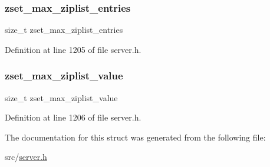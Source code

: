 \subsubsection{\texorpdfstring{zset\+\_\+max\+\_\+ziplist\+\_\+entries}{zset\_max\_ziplist\_entries}}
{\footnotesize\ttfamily size\+\_\+t zset\+\_\+max\+\_\+ziplist\+\_\+entries}



Definition at line 1205 of file server.\+h.

\mbox{\label{structredis_server_ae1bafd11e7b9f269c3ab48acb8046f32}} 
\subsubsection{\texorpdfstring{zset\+\_\+max\+\_\+ziplist\+\_\+value}{zset\_max\_ziplist\_value}}
{\footnotesize\ttfamily size\+\_\+t zset\+\_\+max\+\_\+ziplist\+\_\+value}



Definition at line 1206 of file server.\+h.



The documentation for this struct was generated from the following file\+:\begin{DoxyCompactItemize}
\item 
src/\hyperlink{server_8h}{server.\+h}\end{DoxyCompactItemize}
